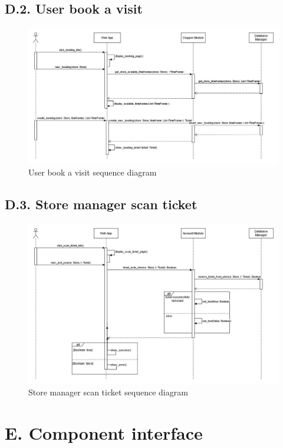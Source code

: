 \subsection{D.2. User book a visit}

\begin{figure}[H]
\centering
\includegraphics{sequence_diagrams/clupper_booking_sequence_diagram}
\caption{User book a visit sequence diagram}
\end{figure}

\subsection{D.3. Store manager scan ticket}

\begin{figure}[H]
\centering
\includegraphics{sequence_diagrams/store_manager_scan_sequence_diagram}
\caption{Store manager scan ticket sequence diagram}
\end{figure}

\section{E. Component interface}

